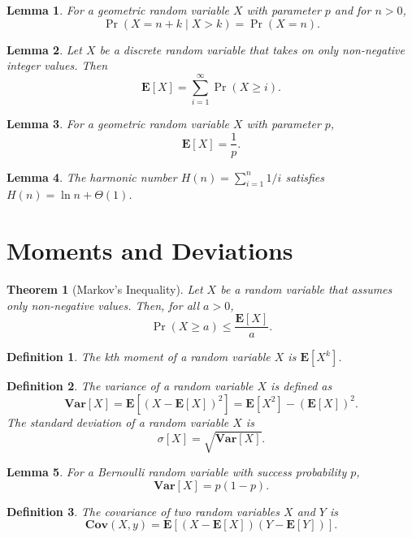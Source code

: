 \documentclass{amsart}
\newtheorem*{definition}{Definition}
\newtheorem*{theorem}{Theorem}
\newtheorem*{lemma}{Lemma}
\newcommand{\E}{\mathbf{E}}
\newcommand{\Var}{\mathbf{Var}}
\newcommand{\Cov}{\mathbf{Cov}}
\begin{document}
\begin{lemma}
  For a geometric random variable $X$ with parameter $p$ and for $n > 0$,
  \[
    \Pr(X = n + k \mid X > k) = \Pr(X = n).
  \]
\end{lemma}

\begin{lemma}
  Let $X$ be a discrete random variable that takes on only non-negative integer
  values. Then
  \[
    \E[X] = \sum_{i = 1}^{\infty} \Pr(X \geq i).
  \]
\end{lemma}

\begin{lemma}
  For a geometric random variable $X$ with parameter $p$,
  \[
    \E[X] = \frac{1}{p}.
  \]
\end{lemma}

\begin{lemma}
  The harmonic number $H(n) = \sum_{i = 1}^n 1/i$ satisfies $H(n) = \ln n +
  \Theta(1)$.
\end{lemma}



\section{Moments and Deviations}

\begin{theorem}[Markov's Inequality]
  Let $X$ be a random variable that assumes only non-negative values. Then, for
  all $a > 0$,
  \[
    \Pr(X \geq a) \leq \frac{\E[X]}{a}.
  \]
\end{theorem}

\begin{definition}
  The kth moment of a random variable $X$ is $\E[X^k]$.
\end{definition}

\begin{definition}
  The \emph{variance} of a random variable $X$ is defined as
  \[
    \Var[X] = \E[{(X - \E[X])}^2] = \E[X^2] - {(\E[X])}^2.
  \]
  The \emph{standard deviation} of a random variable $X$ is
  \[
    \sigma[X] = \sqrt{\Var[X]}.
  \]
\end{definition}

\begin{lemma}
  For a Bernoulli random variable with success probability $p$,
  \[
    \Var[X] = p(1 - p).
  \]
\end{lemma}

\begin{definition}
  The \emph{covariance} of two random variables $X$ and $Y$ is
  \[
    \Cov(X, y) = \E[(X - \E[X]) (Y - \E[Y])].
  \]
\end{definition}
\end{document}
